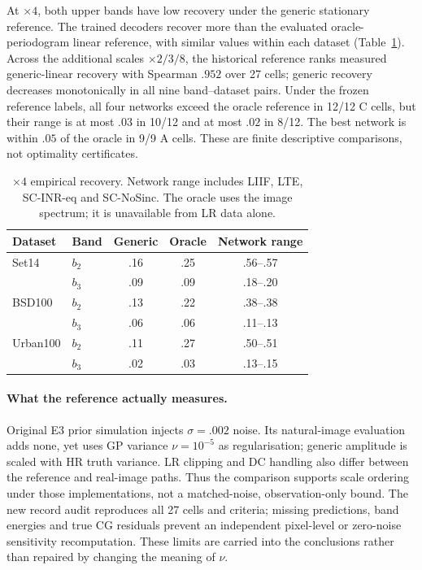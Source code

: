 At $\times4$, both upper bands have low recovery under the generic stationary reference. The trained decoders recover more than the evaluated oracle-periodogram linear reference, with similar values within each dataset (Table~\ref{tab:recovery-main}). Across the additional scales $\times2/3/8$, the historical reference ranks measured generic-linear recovery with Spearman $.952$ over 27 cells; generic recovery decreases monotonically in all nine band--dataset pairs. Under the frozen reference labels, all four networks exceed the oracle reference in 12/12 C cells, but their range is at most $.03$ in 10/12 and at most $.02$ in 8/12. The best network is within $.05$ of the oracle in 9/9 A cells. These are finite descriptive comparisons, not optimality certificates.

\begin{table}[t]\centering\small
\caption{$\times4$ empirical recovery. Network range includes LIIF, LTE, SC-INR-eq and SC-NoSinc. The oracle uses the image spectrum; it is unavailable from LR data alone.}\label{tab:recovery-main}
\begin{tabular}{llccc}\toprule
Dataset & Band & Generic & Oracle & Network range\\\midrule
Set14 & $b_2$ & .16 & .25 & .56--.57\\
& $b_3$ & .09 & .09 & .18--.20\\
BSD100 & $b_2$ & .13 & .22 & .38--.38\\
& $b_3$ & .06 & .06 & .11--.13\\
Urban100 & $b_2$ & .11 & .27 & .50--.51\\
& $b_3$ & .02 & .03 & .13--.15\\\bottomrule
\end{tabular}
\end{table}

\paragraph{What the reference actually measures.} Original E3 prior simulation injects $\sigma=.002$ noise. Its natural-image evaluation adds none, yet uses GP variance $\nu=10^{-5}$ as regularisation; generic amplitude is scaled with HR truth variance. LR clipping and DC handling also differ between the reference and real-image paths. Thus the comparison supports scale ordering under those implementations, not a matched-noise, observation-only bound. The new record audit reproduces all 27 cells and criteria; missing predictions, band energies and true CG residuals prevent an independent pixel-level or zero-noise sensitivity recomputation. These limits are carried into the conclusions rather than repaired by changing the meaning of $\nu$.

